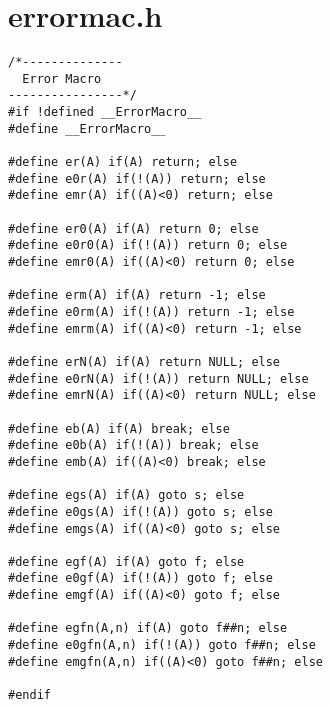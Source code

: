 \section{errormac.h}
\begin{verbatim}
/*--------------
  Error Macro
----------------*/
#if !defined __ErrorMacro__
#define __ErrorMacro__

#define er(A) if(A) return; else
#define e0r(A) if(!(A)) return; else
#define emr(A) if((A)<0) return; else

#define er0(A) if(A) return 0; else
#define e0r0(A) if(!(A)) return 0; else
#define emr0(A) if((A)<0) return 0; else

#define erm(A) if(A) return -1; else
#define e0rm(A) if(!(A)) return -1; else
#define emrm(A) if((A)<0) return -1; else

#define erN(A) if(A) return NULL; else
#define e0rN(A) if(!(A)) return NULL; else
#define emrN(A) if((A)<0) return NULL; else

#define eb(A) if(A) break; else
#define e0b(A) if(!(A)) break; else
#define emb(A) if((A)<0) break; else

#define egs(A) if(A) goto s; else
#define e0gs(A) if(!(A)) goto s; else
#define emgs(A) if((A)<0) goto s; else

#define egf(A) if(A) goto f; else
#define e0gf(A) if(!(A)) goto f; else
#define emgf(A) if((A)<0) goto f; else

#define egfn(A,n) if(A) goto f##n; else
#define e0gfn(A,n) if(!(A)) goto f##n; else
#define emgfn(A,n) if((A)<0) goto f##n; else

#endif
\end{verbatim}

